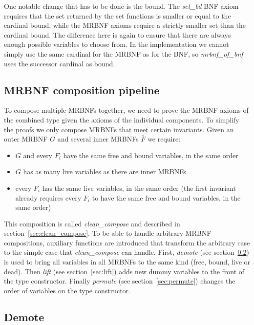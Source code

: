 One notable change that has to be done is the bound. The \textit{set\_bd} \ac{BNF} axiom requires that the set returned by the set functions is smaller or equal to the cardinal bound, while the \ac{MRBNF} axioms require a strictly smaller set than the cardinal bound. The difference here is again to ensure that there are always enough possible variables to choose from. In the implementation we cannot simply use the same cardinal for the \ac{MRBNF} as for the \ac{BNF}, so \textit{mrbnf\_of\_bnf} uses the successor cardinal as bound.

\subsection{\acs{MRBNF} composition pipeline}\label{sec:composition}

To compose multiple \acp{MRBNF} together, we need to prove the \ac{MRBNF} axioms of the combined type given the axioms of the individual components. To simplify the proofs we only compose \acp{MRBNF} that meet certain invariants. Given an outer \ac{MRBNF} $G$ and several inner \acp{MRBNF} $\overline{F}$ we require:

\begin{itemize}
\item{$G$ and every $F_i$ have the same free and bound variables, in the same order}
\item{$G$ has as many live variables as there are inner \acp{MRBNF}}
\item{every $F_i$ has the same live variables, in the same order (the first invariant already requires every $F_i$ to have the same free and bound variables, in the same order)}
\end{itemize}

This composition is called \textit{clean\_compose} and described in section~\ref{sec:clean_compose}. To be able to handle arbitrary \ac{MRBNF} compositions, auxiliary functions are introduced that transform the arbitrary case to the simple case that \textit{clean\_compose} can handle. First, \textit{demote} (see section~\ref{sec:demote}) is used to bring all variables in all \acp{MRBNF} to the same kind (free, bound, live or dead). Then \textit{lift} (see section~\ref{sec:lift}) adds new dummy variables to the front of the type constructor. Finally \textit{permute} (see section~\ref{sec:permute}) changes the order of variables on the type constructor.

\subsection{Demote}\label{sec:demote}

